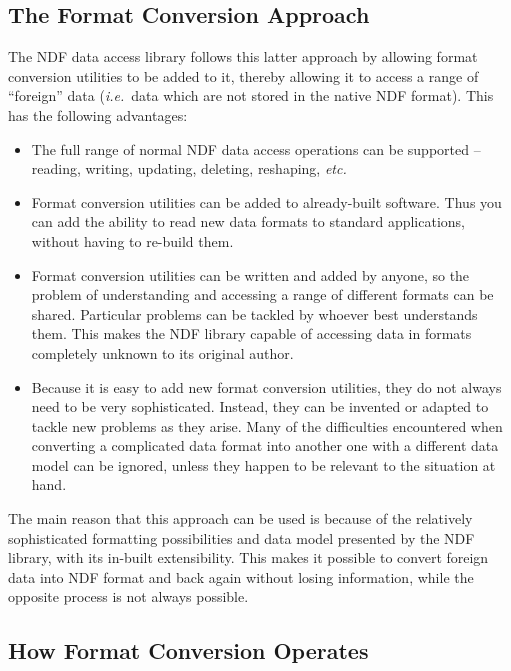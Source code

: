 \documentclass[11pt,twoside,nolof]{starlink}
\providecommand{\st}[1]{{\em{#1}}}
\begin{document}
\subsection{The Format Conversion Approach}

The NDF data access library follows this latter approach by allowing
format conversion utilities to be added to it, thereby allowing it to
access a range of ``foreign'' data (\st{i.e.}\ data which are not
stored in the native NDF format). This has the following advantages:

\begin{itemize}
\item The full range of normal NDF data access operations can be
supported -- reading, writing, updating, deleting, reshaping, \st{etc.}

\item Format conversion utilities can be added to already-built
software. Thus you can add the ability to read new data formats to
standard applications, without having to re-build them.

\item Format conversion utilities can be written and added by anyone,
so the problem of understanding and accessing a range of different
formats can be shared. Particular problems can be tackled by whoever
best understands them. This makes the NDF library capable of accessing
data in formats completely unknown to its original author.

\item Because it is easy to add new format conversion utilities, they
do not always need to be very sophisticated. Instead, they can be
invented or adapted to tackle new problems as they arise.  Many of the
difficulties encountered when converting a complicated data format
into another one with a different data model can be ignored, unless
they happen to be relevant to the situation at hand.

\end{itemize}

The main reason that this approach can be used is because of the
relatively sophisticated formatting possibilities and data model
presented by the NDF library, with its in-built extensibility.  This
makes it possible to convert foreign data into NDF format and back
again without losing information, while the opposite process is not
always possible.

\subsection{How Format Conversion Operates}
\end{document}
